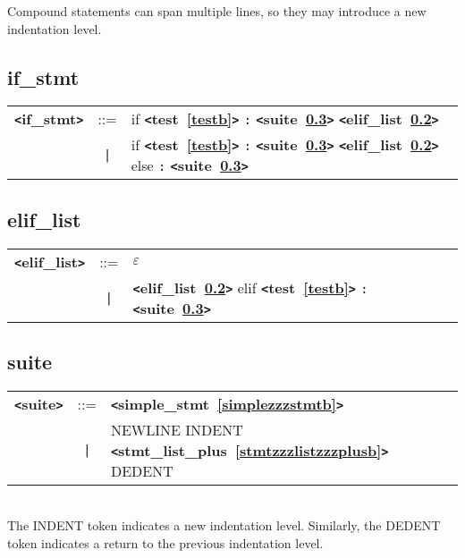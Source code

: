 \documentclass[12pt]{article}
\begin{document}
Compound statements can span multiple lines, so they may introduce a new indentation level.

\subsection{if\_stmt}
\label{ifzzzstmtb}
\newlength{\tw}
\settowidth{\tw}{if\_stmt  ::=  }
\addtolength{\tw}{2\arraycolsep}
\newlength{\len}
\setlength{\len}{\textwidth}
\addtolength{\len}{-1\tw}
\begin{tabular}{lcp{\len}}
{\bf \verb+<+if\_stmt\verb+>+} & ::=  & if {\bf \verb+<+test~\ref{testb}\verb+>+}  \verb|:| {\bf \verb+<+suite~\ref{suiteb}\verb+>+}  {\bf \verb+<+elif\_list~\ref{elifzzzlistb}\verb+>+}  \\
 & \verb+|+  & if {\bf \verb+<+test~\ref{testb}\verb+>+}  \verb|:| {\bf \verb+<+suite~\ref{suiteb}\verb+>+}  {\bf \verb+<+elif\_list~\ref{elifzzzlistb}\verb+>+}  else \verb|:| {\bf \verb+<+suite~\ref{suiteb}\verb+>+}  \\
\end{tabular}

\subsection{elif\_list}
\label{elifzzzlistb}
\begin{tabular}{lcl}
{\bf \verb+<+elif\_list\verb+>+} & ::=  & $\varepsilon$ \\
 & \verb+|+  & {\bf \verb+<+elif\_list~\ref{elifzzzlistb}\verb+>+}  elif {\bf \verb+<+test~\ref{testb}\verb+>+}  \verb|:| {\bf \verb+<+suite~\ref{suiteb}\verb+>+}  \\
\end{tabular}

\subsection{suite}
\label{suiteb}
\begin{tabular}{lcl}
{\bf \verb+<+suite\verb+>+} & ::=  & {\bf \verb+<+simple\_stmt~\ref{simplezzzstmtb}\verb+>+}  \\
 & \verb+|+  & NEWLINE INDENT {\bf \verb+<+stmt\_list\_plus~\ref{stmtzzzlistzzzplusb}\verb+>+}  DEDENT \\
\end{tabular} \\

The INDENT token indicates a new indentation level.  Similarly, the DEDENT token indicates a return to the previous indentation level.
\end{document}
